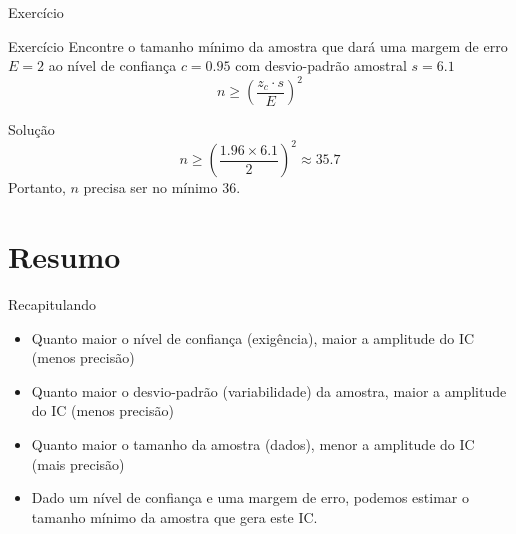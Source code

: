 \documentclass{beamer}
\begin{document}
\begin{frame}{Exercício}
  \begin{block}{Exercício}
    Encontre o tamanho mínimo da amostra que dará uma margem de erro
    $E=2$ ao nível de confiança $c=0.95$ com desvio-padrão amostral $s=6.1$
    \begin{displaymath}
      n \ge \left(\frac{z_c \cdot s}{E}\right)^2
    \end{displaymath}
  \end{block}
  \begin{block}{Solução}
    \begin{displaymath}
      n \ge \left(\frac{1.96 \times 6.1}{2}\right)^2 \approx 35.7
    \end{displaymath}
    Portanto, $n$ precisa ser no mínimo $36$.
  \end{block}
\end{frame}

\section{Resumo}

\begin{frame}{Recapitulando}
  \begin{itemize}
  \item Quanto maior o nível de confiança (exigência), maior a
    amplitude do IC (menos precisão)
  \item Quanto maior o desvio-padrão (variabilidade) da amostra, maior
    a amplitude do IC (menos precisão)
  \item Quanto maior o tamanho da amostra (dados), menor a amplitude
    do IC (mais precisão)
  \item Dado um nível de confiança e uma margem de erro, podemos
    estimar o tamanho mínimo da amostra que gera este IC.
  \end{itemize}
\end{frame}
\end{document}
